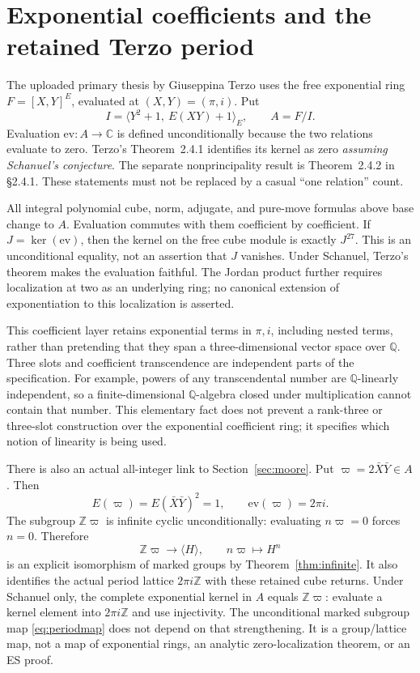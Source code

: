 \documentclass[11pt,reqno]{amsart}
\theoremstyle{definition}\newtheorem{definition}[theorem]{Definition}
\theoremstyle{remark}\newtheorem{remark}[theorem]{Remark}
\newcommand{\Q}{\mathbb Q}\newcommand{\R}{\mathbb R}\newcommand{\C}{\mathbb C}\newcommand{\Z}{\mathbb Z}\newcommand{\OO}{\mathbb O}
\begin{document}
\section{Exponential coefficients and the retained Terzo period}

The uploaded primary thesis by Giuseppina Terzo \cite{Terzo} uses the free
exponential ring $F=[X,Y]^E$, evaluated at $(X,Y)=(\pi,i)$. Put
\[
 I=\langle Y^2+1,\ E(XY)+1\rangle_E,\qquad A=F/I.
\]
Evaluation $\mathrm{ev}:A\to\C$ is defined unconditionally because the two
relations evaluate to zero. Terzo's Theorem~2.4.1 identifies its kernel as zero
\emph{assuming Schanuel's conjecture}. The separate nonprincipality result is
Theorem~2.4.2 in \S2.4.1. These statements must not be replaced by a casual
``one relation'' count.

All integral polynomial cube, norm, adjugate, and pure-move formulas above base
change to $A$. Evaluation commutes with them coefficient by coefficient. If
$J=\ker(\mathrm{ev})$, then the kernel on the free cube module is exactly
$J^{27}$. This is an unconditional equality, not an assertion that $J$ vanishes.
Under Schanuel, Terzo's theorem makes the evaluation faithful. The Jordan
product further requires localization at two as an underlying ring; no
canonical extension of exponentiation to this localization is asserted.

This coefficient layer retains exponential terms in $\pi,i$, including nested
terms, rather than pretending that they span a three-dimensional vector space
over $\Q$. Three slots and coefficient transcendence are independent parts of
the specification. For example, powers of any transcendental number are
$\Q$-linearly independent, so a finite-dimensional $\Q$-algebra closed under
multiplication cannot contain that number. This elementary fact does not
prevent a rank-three or three-slot construction over the exponential
coefficient ring; it specifies which notion of linearity is being used.

There is also an actual all-integer link to Section~\ref{sec:moore}. Put
$\varpi=2\bar X\bar Y\in A$. Then
\[
 E(\varpi)=E(\bar X\bar Y)^2=1,\qquad
 \mathrm{ev}(\varpi)=2\pi i.
\]
The subgroup $\Z\varpi$ is infinite cyclic unconditionally: evaluating
$n\varpi=0$ forces $n=0$. Therefore
\begin{equation}\label{eq:periodmap}
 \Z\varpi\longrightarrow\langle H\rangle,\qquad
 n\varpi\longmapsto H^n
\end{equation}
is an explicit isomorphism of marked groups by Theorem~\ref{thm:infinite}.
It also identifies the actual period lattice $2\pi i\Z$ with these retained
cube returns. Under Schanuel only, the complete exponential kernel in $A$
equals $\Z\varpi$: evaluate a kernel element into $2\pi i\Z$ and use
injectivity. The unconditional marked subgroup map \eqref{eq:periodmap} does
not depend on that strengthening. It is a group/lattice map, not a map of
exponential rings, an analytic zero-localization theorem, or an ES proof.
\end{document}
